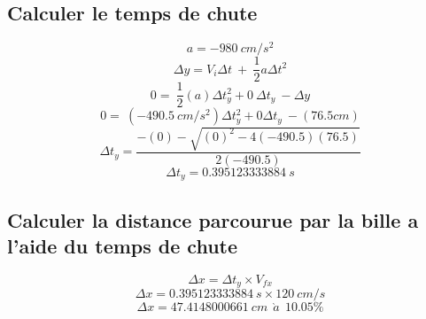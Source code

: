\documentclass{article}
\begin{document}
            \subsection{Calculer le temps de chute}
                \setcounter{equation}{0}
                \vspace{5mm}
                \vspace{5mm}
                \begin{equation}
                    a = -980 \ cm/s^2
                \end{equation}
                \vspace{5mm}
                \begin{equation}
                    \Delta y = V_i \Delta t \ + \ \frac{1}{2} a \Delta t ^2
                \end{equation}
               \vspace{5mm}
                \begin{equation}
                    0 = \ \frac{1}{2}(a) \Delta t_y ^2 + 0 \ \Delta t_y \  - \Delta y
                \end{equation}
                \vspace{5mm}
                \begin{equation}
                    0 = \ (-490.5 \ cm/s^2) \Delta t_y ^2 + 0\Delta t_y \  - (76.5cm)
                \end{equation}
                \vspace{5mm}
                \begin{equation}
                    \Delta t_y = \frac{-(0)-\sqrt{(0)^2 - 4(-490.5)(76.5)}}{2(-490.5)}
                \end{equation}
                \vspace{5mm}
                \begin{equation}
                    \Delta t_y = 0.395123333884 \ s
                \end{equation}
                \vspace{5mm}
            \subsection{Calculer la distance parcourue par la bille a l'aide du temps de chute}
                \vspace{5mm}
                \begin{equation}
                    \Delta x = \Delta t_y \times V_{fx}
                \end{equation}
                \vspace{5mm}
                \begin{equation}
                    \Delta x = 0.395123333884 \ s \times 120 \ cm/s
                \end{equation}
                \vspace{5mm}
                \begin{equation}
                    \Delta x = 47.4148000661 \ cm \ \ \grave{a} \ \ 10.05 \%
                \end{equation}
\end{document}
